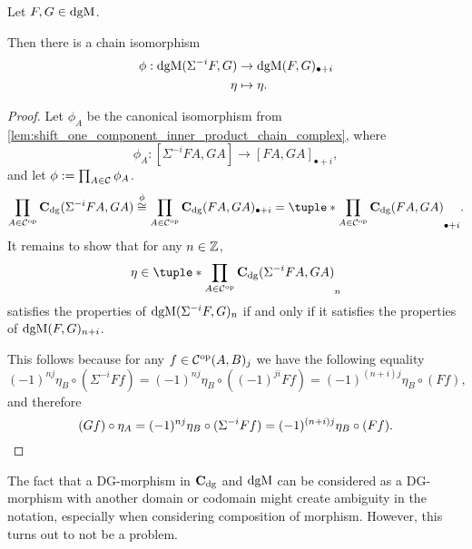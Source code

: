 \begin{lemma}
    \label{lem:dgmod_shift_eq_plus}
    Let \( F, G \in \operatorname{dgM} \).

    Then there is a chain isomorphism
    \begin{align*}
        \phi: \operatorname{dgM}(\Sigma^{-i} F, G) &\to \operatorname{dgM}(F, G)_{\bullet + i} \\
        \eta &\mapsto \eta.
    \end{align*}
\end{lemma}
\begin{proof}
    Let \( \phi_A \) be the canonical isomorphism from \autoref{lem:shift_one_component_inner_product_chain_complex}, where
    \[ 
    \phi_A: [\Sigma^{-i} F A, G A] \to [F A, G A]_{\bullet+i},
    \]
    and let \( \phi := \prod_{A \in {\mathcal{C}}} \phi_A \).
    \[
        \prod_{A \in \Cc^{\op}} \C_{\dg}(\Sigma^{-i} F A, G A) \stackrel{\phi}{\cong} \prod_{A \in \Cc^{\op}} \C_{\dg}(F A, G A)_{\bullet+i} = \tuple*{\prod_{A \in \Cc^{\op}} \C_{\dg}(F A, G A)}_{\bullet+i}.
    \]
    It remains to show that for any \( n \in {\mathbb{Z}} \),
    \[
        \eta \in \tuple*{\prod_{A \in \Cc^{\op}} \C_{\dg}(\Sigma^{-i} F A, G A)}_n
    \]
    satisfies the properties of \( \operatorname{dgM}(\Sigma^{-i} F, G)_n \) if and only if it satisfies the properties of \( \operatorname{dgM}(F, G)_{n + i} \).

    This follows because for any \( f \in {\mathcal{C}}^{\operatorname{op}}(A, B)_j \) we have the following equality
    \[
        (-1)^{nj} \eta_B \circ (\Sigma^{-i} F f) = (-1)^{nj} \eta_B \circ ((-1)^{ji}F f) = (-1)^{(n + i)j}\eta_B \circ (F f),
    \]
    and therefore
    \[
        (G f) \circ \eta_A = (-1)^{nj} \eta_B \circ (\Sigma^{-i} F f) = (-1)^{(n + i)j}\eta_B \circ (F f). \qedhere
    \]
\end{proof}

The fact that a DG-morphism in \( \operatorname{\mathbf{C}}_{\operatorname{dg}} \) and \( \operatorname{dgM} \) can be considered as a DG-morphism with another domain or codomain might create ambiguity in the notation, especially when considering  composition of morphism. However, this turns out to not be a problem.

